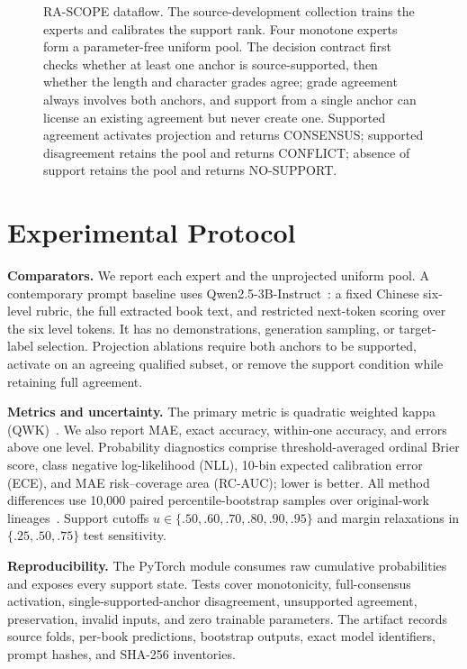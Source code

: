 \documentclass[conference]{IEEEtran}
\begin{document}
\begin{figure}[!t]
\centering
\resizebox{\textwidth}{!}{}
\caption{RA-SCOPE dataflow. The source-development collection trains the
experts and calibrates the support rank. Four monotone experts form a
parameter-free uniform pool. The decision contract first checks whether at least
one anchor is source-supported, then whether the length and character grades
agree; grade agreement always involves both anchors, and support from a single
anchor can license an existing agreement but never create one. Supported
agreement activates projection and returns CONSENSUS; supported disagreement
retains the pool and returns CONFLICT; absence of support retains the pool and
returns NO-SUPPORT.}
\label{fig_dataflow}
\end{figure}

\section{Experimental Protocol}

\noindent\textbf{Comparators.} We report each expert and the unprojected uniform
pool. A contemporary prompt baseline uses Qwen2.5-3B-Instruct~\cite{qwen2024technical}:
a fixed Chinese six-level rubric, the full extracted book text, and restricted
next-token scoring over the six level tokens. It has no demonstrations,
generation sampling, or target-label selection. Projection ablations require
both anchors to be supported, activate on an agreeing qualified subset, or
remove the support condition while retaining full agreement.

\noindent\textbf{Metrics and uncertainty.} The primary metric is quadratic
weighted kappa (QWK)~\cite{cohen1968weighted}. We also report MAE, exact
accuracy, within-one accuracy, and errors above one level. Probability
diagnostics comprise threshold-averaged ordinal Brier score, class negative
log-likelihood (NLL), 10-bin expected calibration error (ECE), and MAE
risk--coverage area (RC-AUC); lower is better. All method differences use
10{,}000 paired percentile-bootstrap samples over original-work
lineages~\cite{efron1993introduction}. Support cutoffs
$u \in \{.50,.60,.70,.80,.90,.95\}$ and margin relaxations in $\{.25,.50,.75\}$
test sensitivity.

\noindent\textbf{Reproducibility.} The PyTorch module consumes raw cumulative
probabilities and exposes every support state. Tests cover monotonicity,
full-consensus activation, single-supported-anchor disagreement, unsupported
agreement, preservation, invalid inputs, and zero trainable parameters. The
artifact records source folds, per-book predictions, bootstrap outputs, exact
model identifiers, prompt hashes, and SHA-256 inventories.
\end{document}
